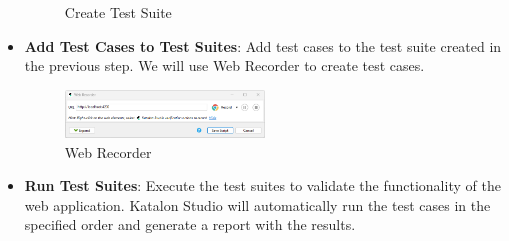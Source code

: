 \begin{itemize}
\begin{figure}[H]
    \caption{Create Test Suite}
    \label{fig:newtest_suite}
  \end{figure}
  \item \textbf{Add Test Cases to Test Suites}: Add test cases to the test suite created in the previous step. We will use Web Recorder to create test cases.
  \begin{figure}[H]
    \centering
    \includegraphics[width=0.5\textwidth]{graphics/chapter6/web_recorder.png}
    \caption{Web Recorder}
    \label{fig:web_recorder}
  \end{figure}
  \item \textbf{Run Test Suites}: Execute the test suites to validate the functionality of the web application. Katalon Studio will automatically run the test cases in the specified order and generate a report with the results.
\end{itemize}
